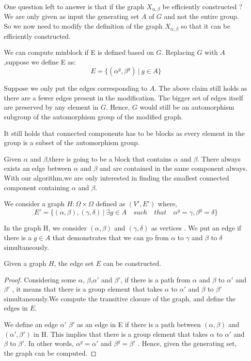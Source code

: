 
One question left to answer is that if the graph $X_{\alpha,\beta}$ be efficiently constructed ? We are only given as input the generating set $A$ of $G$ and not the entire group. So we now need to modify the definition of the graph $X_{\alpha,\beta}$ so that it can be efficiently constructed.


We can compute minblock if E is defined based on $G$. 
Replacing $G$ with $A$,suppose we define E as:
\[ E = \{(\alpha^{g},\beta^{g}) ~|~ g \in A\} \]

Suppose we only put the edges corresponding to $A$. The above claim still holds as there are a fewer edges present in the modification. The bigger set of edges itself are preserved by any element in $G$. Hence, $G$ would still be an automorphism subgroup of the automorphism group of the modified graph. 

It still holds that connected components has to be blocks as every element in the group is a subset of the automorphism group.

Given $\alpha$ and $\beta$,there is going to be a block that contains $\alpha$ and $\beta$. There always exists an edge between $\alpha$ and $\beta$ and are contained in the same component always. With our algorithm,we are only interested in finding the smallest connected component containing $\alpha$ and $\beta$.


We consider a graph $H : \Omega \times \Omega$ defined as $(V',E')$ where,
\[ E' = \{(\alpha,\beta),(\gamma,\delta) ~|~ \exists g \in A \quad such \quad that  \quad \alpha^g = \gamma , \beta^g = \delta\} \]

In the graph H, we consider $(\alpha , \beta)$ and $(\gamma , \delta)$ as vertices . We put an edge if there is a $g \in A$ that demonstrates that we can go from $\alpha$ to $\gamma$ and $\beta$ to $\delta$ simultaneously.

\begin{claim} Given a graph $H$, the edge set $E$ can be constructed.
\begin{proof} Considering some $\alpha$, $\beta$,$\alpha'$ and $\beta'$, if there is a path from $\alpha$ and $\beta$ to $\alpha'$ and $\beta'$ , it means that there is a group element that takes $\alpha$ to $\alpha'$ and $\beta$ to $\beta'$ simultaneously.We compute the transitive closure of the graph, and define the edges in $E$.


We define an edge $\alpha'$ $\beta'$ as an edge in E if there is a path between $(\alpha,\beta)$ and $(\alpha',\beta')$ in H. This implies that there is a group element that takes $\alpha$ to $\alpha'$ and $\beta$ to $\beta'$. 
In other words, $\alpha^g = \alpha'$ and $\beta^g = \beta'$ .
Hence, given the generating set, the graph can be computed.
\end{proof}
\end{claim}


